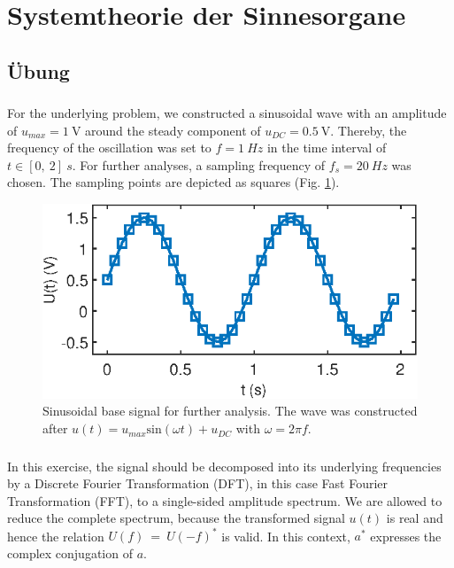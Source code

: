 \clearpage
\section*{Systemtheorie der Sinnesorgane}
\subsection{Übung}
\subsubsection{}
For the underlying problem, we constructed a sinusoidal wave with an amplitude of $u_{max} = \SI{1}{\volt}$ around the steady component of $u_{DC} = \SI{0.5}{\volt}$. Thereby, the frequency of the oscillation was set to $f = \SI{1}{Hz}$ in the time interval of $t \in [0,\ 2]\ \si{s}$. For further analyses, a sampling frequency of $f_s = \SI{20}{Hz}$ was chosen. The sampling points are depicted as squares (Fig. \ref{fig:signal}).
\begin{figure}[h] 
  \centering
  \includegraphics[scale=1]{ue1/signal.eps} %
  \caption{Sinusoidal base signal for further analysis. The wave was constructed after $u(t) = u_{max} \mathrm{sin}(\omega t) +u_{DC}$ with $\omega = 2\pi f$.}
  \label{fig:signal}
\end{figure}
\subsubsection{}
In this exercise, the signal should be decomposed into its underlying frequencies by a Discrete Fourier Transformation (DFT), in this case Fast Fourier Transformation (FFT), to a single-sided amplitude spectrum. We are allowed to reduce the complete spectrum, because the transformed signal $u(t)$ is real and hence the relation $U(f)\ =\ U(-f)^*$ is valid. In this context, $a^*$ expresses the complex conjugation of $a$.

